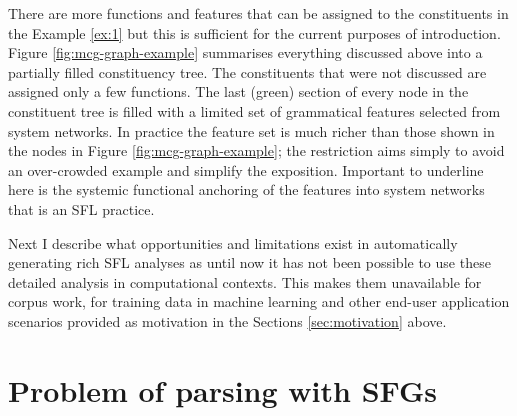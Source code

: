 There are more functions and features that can be assigned to the constituents in the Example \ref{ex:1} but this is sufficient for the current purposes of introduction. Figure \ref{fig:mcg-graph-example} summarises everything discussed above into a partially filled constituency tree. The constituents that were not discussed are assigned only a few functions. %
The last (green) section of every node in the constituent tree is filled with a limited set of grammatical features selected from system networks. In practice the feature set is much richer than those shown in the nodes in Figure \ref{fig:mcg-graph-example}; the restriction aims simply to avoid an over-crowded example and simplify the exposition. Important to underline here is the systemic functional anchoring of the features into system networks that is an SFL practice.


Next I describe what opportunities and limitations exist in automatically generating rich SFL analyses as until now it has not been possible to use these detailed analysis in computational contexts. This makes them unavailable for corpus work, for training data in machine learning and other end-user application scenarios provided as motivation in the Sections \ref{sec:motivation} above.

\section{Problem of parsing with SFGs}
\label{sec:problem}


